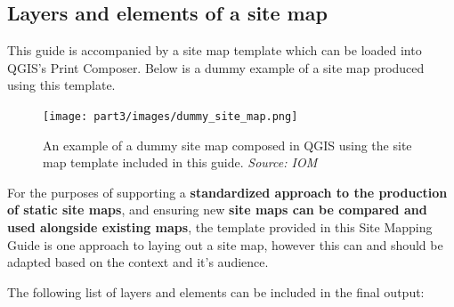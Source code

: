 \documentclass[
  a4paper,
  onecolumn,
  oneside]{book}
\begin{document}
\hypertarget{layers-and-elements-of-a-site-map}{%
\subsection{Layers and elements of a site
map}\label{layers-and-elements-of-a-site-map}}

This guide is accompanied by a site map template which can be loaded
into QGIS's Print Composer. Below is a dummy example of a site map
produced using this template.

\begin{figure}

{\centering \texttt{[image: part3/images/dummy\_site\_map.png]}

}

\caption{An example of a dummy site map composed in QGIS using the site
map template included in this guide. \emph{Source: IOM}}

\end{figure}

\begin{tcolorbox}[enhanced jigsaw, opacitybacktitle=0.6, colbacktitle=quarto-callout-note-color!10!white, breakable, coltitle=black, title=\textcolor{quarto-callout-note-color}{\faInfo}\hspace{0.5em}{Note}, toprule=.15mm, bottomrule=.15mm, colback=white, left=2mm, toptitle=1mm, bottomtitle=1mm, arc=.35mm, colframe=quarto-callout-note-color-frame, titlerule=0mm, opacityback=0, rightrule=.15mm, leftrule=.75mm]

For the purposes of supporting a \textbf{standardized approach to the
production of static site maps}, and ensuring new \textbf{site maps can
be compared and used alongside existing maps}, the template provided in
this Site Mapping Guide is one approach to laying out a site map,
however this can and should be adapted based on the context and it's
audience.

\end{tcolorbox}

The following list of layers and elements can be included in the final
output:
\end{document}
